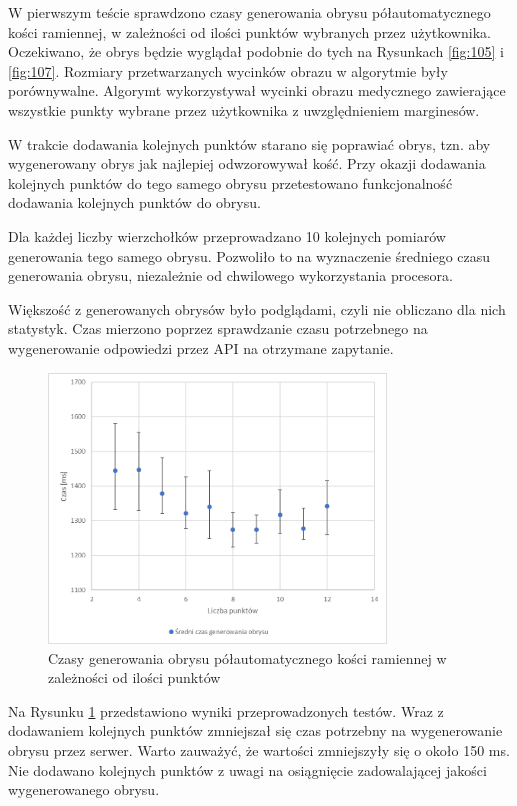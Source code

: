 \documentclass[a4paper,11pt,twoside,openright]{report}
\theoremstyle{definition}
\begin{document}
W pierwszym teście sprawdzono czasy generowania obrysu półautomatycznego kości
ramiennej, w zależności od ilości punktów wybranych przez użytkownika. Oczekiwano,
że obrys będzie wyglądał podobnie do tych na Rysunkach \ref{fig:105} i \ref{fig:107}.
Rozmiary przetwarzanych wycinków obrazu w algorytmie były porównywalne. Algorymt
wykorzystywał wycinki obrazu medycznego zawierające wszystkie punkty wybrane
przez użytkownika z uwzględnieniem marginesów.

W trakcie dodawania kolejnych punktów starano się poprawiać obrys, tzn. aby
wygenerowany obrys jak najlepiej odwzorowywał kość. Przy okazji dodawania kolejnych
punktów do tego samego obrysu przetestowano funkcjonalność dodawania kolejnych
punktów do obrysu.

Dla każdej liczby wierzchołków przeprowadzano 10 kolejnych pomiarów generowania
tego samego obrysu. Pozwoliło to na wyznaczenie średniego czasu generowania obrysu,
niezależnie od chwilowego wykorzystania procesora.

Większość z generowanych obrysów było podglądami, czyli nie obliczano dla nich
statystyk. Czas mierzono poprzez sprawdzanie czasu potrzebnego na wygenerowanie
odpowiedzi przez API na otrzymane zapytanie.

\begin{figure}[h!]
	\center
	\includegraphics[width=0.8\textwidth]{testy_1}
	\caption{Czasy generowania obrysu półautomatycznego kości ramiennej w zależności od ilości punktów}
    	\label{fig:testy_1}
\end{figure}

Na Rysunku \ref{fig:testy_1} przedstawiono wyniki przeprowadzonych testów. Wraz
z dodawaniem kolejnych punktów zmniejszał się czas potrzebny na wygenerowanie
obrysu przez serwer. Warto zauważyć, że wartości zmniejszyły się o około 150 ms.
Nie dodawano kolejnych punktów z uwagi na osiągnięcie zadowalającej jakości
wygenerowanego obrysu.
\end{document}
